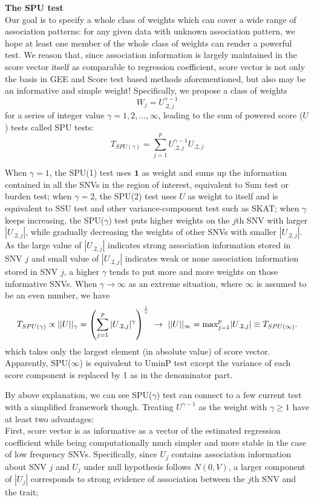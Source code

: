 \documentclass[12pt]{article}
\begin{document}
\textbf{The SPU test}\\
Our goal is to specify a whole class of weights which can cover a wide range of association patterns: for any given data with unknown association pattern, we hope at least one member of the whole class of weights can render a powerful test. We reason that, since association information is largely maintained in the score vector itself as comparable to regression coefficient, score vector is not only the basis in GEE and Score test based methods aforementioned, but also may be an informative and simple weight! Specifically, we propose a class of weights 
$$W_j = U_{.2, j} ^ { \gamma - 1} $$
for a series of integer value $\gamma = 1,2,\ldots,\infty$, leading to the sum of powered score ($U$) tests called SPU tests:
$$
T_{ SPU ( \gamma ) } = \sum_{j=1}^p U_{.2, j} ^ { \gamma - 1} U_{.2, j}
$$

When $\gamma = 1$, the SPU(1) test uses $\textbf{1}$ as weight and sums up the information contained in all the SNVs in the region of interest, equivalent to Sum test or burden test; when $\gamma = 2$, the SPU(2) test uses $U$ as weight to itself and is equivalent to SSU test and other variance-component test such as SKAT; when $\gamma$ keeps increasing, the SPU($\gamma$) test puts higher weights on the $j$th SNV with larger $|U_{.2,j}|$, while gradually decreasing the weights of other SNVs with smaller $|U_{.2,j}|$. As the large value of $|U_{.2,j}|$ indicates strong association information stored in SNV $j$ and small value of $|U_{.2,j}|$ indicates weak or none association information stored in SNV $j$, a higher $\gamma$ tends to put more and more weights on those informative SNVs. When $\gamma \rightarrow \infty$ as an extreme situation, where $\infty$ is assumed to be an even number, we have
$$
T_{ SPU(\gamma) } \propto ||U||_{\gamma} = \left( \sum_{j=1}^p |U_{.2, j}| ^ { \gamma } \right) ^ { 1 \over \gamma } \ \rightarrow \ ||U||_{\infty} = \textrm{max}_{j=1} ^ p |U_{.2, j}| \equiv T_{ SPU(\infty) }.
$$ 
which takes only the largest element (in absolute value) of score vector. Apparently, SPU($\infty$) is equivalent to UminP test except the variance of each score component is replaced by 1 as in the denominator part.

By above explanation, we can see SPU($\gamma$) test can connect to a few current test with a simplified framework though. Treating $U^{\gamma - 1}$ as the weight with $\gamma \geq 1$ have at least two advantages:\\ 
First, score vector is as informative as a vector of the estimated regression coefficient while being computationally much simpler and more stable in the case of low frequency SNVs. Specifically, since $U_j$ contains association information about SNV $j$ and $U_j$ under null hypothesis follows $N(0, V)$, a larger component of $|U_j|$ corresponds to strong evidence of association between the $j$th SNV and the trait;
\end{document}
